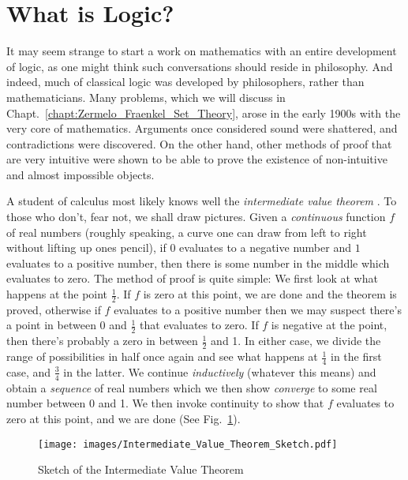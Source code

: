 \section{What is Logic?}
    It may seem strange to start a work on mathematics with an entire
    development of logic, as one might think such conversations should reside
    in philosophy. And indeed, much of classical logic was developed by
    philosophers, rather than mathematicians. Many problems, which we will
    discuss in Chapt.~\ref{chapt:Zermelo_Fraenkel_Set_Theory}, arose in the
    early 1900s with the very core of mathematics. Arguments once considered
    sound were shattered, and contradictions were discovered. On the other hand,
    other methods of proof that are very intuitive were shown to be able to
    prove the existence of non-intuitive and almost impossible objects.
    \begin{example}
        A student of calculus most likely knows well the
        \textit{intermediate value theorem}%
        . To those who don't, fear not, we
        shall draw pictures. Given a \textit{continuous} function $f$ of real
        numbers (roughly speaking, a curve one can draw from left to right
        without lifting up ones pencil), if $0$ evaluates to a negative number
        and $1$ evaluates to a positive number, then there is some number in the
        middle which evaluates to zero. The method of proof is quite simple:
        We first look at what happens at the point $\frac{1}{2}$. If $f$
        is zero at this point, we are done and the theorem is proved, otherwise
        if $f$ evaluates to a positive number then we may suspect there's a
        point in between 0 and $\frac{1}{2}$ that evaluates to zero. If $f$ is
        negative at the point, then there's probably a zero in between
        $\frac{1}{2}$ and 1. In either case, we divide the range of
        possibilities in half once again and see what happens at $\frac{1}{4}$
        in the first case, and $\frac{3}{4}$ in the latter. We continue
        \textit{inductively} (whatever this means) and obtain a
        \textit{sequence} of real numbers which we then show
        \textit{converge} to some real number between 0 and 1. We then invoke
        continuity to show that $f$ evaluates to zero at this point, and we are
        done (See Fig.~\ref{fig:Sketch_of_IVP}).
    \end{example}
    \begin{figure}[H]
        \centering
        \captionsetup{type=figure}
        \texttt{[image: images/Intermediate\_Value\_Theorem\_Sketch.pdf]}
        \caption{Sketch of the Intermediate Value Theorem}
        \label{fig:Sketch_of_IVP}
    \end{figure}
